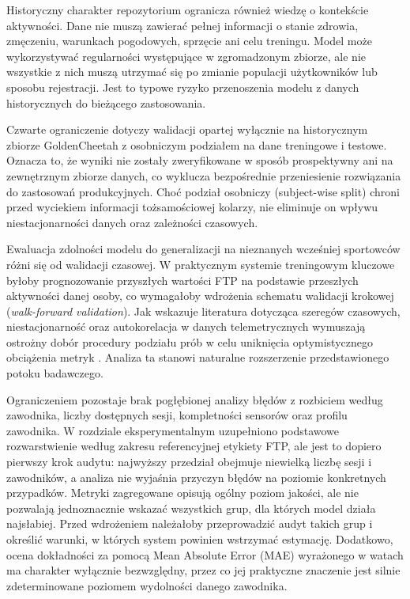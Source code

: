 Historyczny charakter repozytorium ogranicza również wiedzę o kontekście aktywności. Dane nie muszą zawierać pełnej informacji o stanie zdrowia, zmęczeniu, warunkach pogodowych, sprzęcie ani celu treningu. Model może wykorzystywać regularności występujące w zgromadzonym zbiorze, ale nie wszystkie z nich muszą utrzymać się po zmianie populacji użytkowników lub sposobu rejestracji. Jest to typowe ryzyko przenoszenia modelu z danych historycznych do bieżącego zastosowania.

Czwarte ograniczenie dotyczy walidacji opartej wyłącznie na historycznym zbiorze GoldenCheetah z osobniczym podziałem na dane treningowe i testowe. Oznacza to, że wyniki nie zostały zweryfikowane w sposób prospektywny ani na zewnętrznym zbiorze danych, co wyklucza bezpośrednie przeniesienie rozwiązania do zastosowań produkcyjnych. Choć podział osobniczy (subject-wise split) chroni przed wyciekiem informacji tożsamościowej kolarzy, nie eliminuje on wpływu niestacjonarności danych oraz zależności czasowych.

Ewaluacja zdolności modelu do generalizacji na nieznanych wcześniej sportowców różni się od walidacji czasowej. W praktycznym systemie treningowym kluczowe byłoby prognozowanie przyszłych wartości FTP na podstawie przeszłych aktywności danej osoby, co wymagałoby wdrożenia schematu walidacji krokowej (\textit{walk-forward validation}). Jak wskazuje literatura dotycząca szeregów czasowych, niestacjonarność oraz autokorelacja w danych telemetrycznych wymuszają ostrożny dobór procedury podziału prób w celu uniknięcia optymistycznego obciążenia metryk \parencite{bergmeir2018timeSeriesCv}. Analiza ta stanowi naturalne rozszerzenie przedstawionego potoku badawczego.

Ograniczeniem pozostaje brak pogłębionej analizy błędów z rozbiciem według zawodnika, liczby dostępnych sesji, kompletności sensorów oraz profilu zawodnika. W rozdziale eksperymentalnym uzupełniono podstawowe rozwarstwienie według zakresu referencyjnej etykiety FTP, ale jest to dopiero pierwszy krok audytu: najwyższy przedział obejmuje niewielką liczbę sesji i zawodników, a analiza nie wyjaśnia przyczyn błędów na poziomie konkretnych przypadków. Metryki zagregowane opisują ogólny poziom jakości, ale nie pozwalają jednoznacznie wskazać wszystkich grup, dla których model działa najsłabiej. Przed wdrożeniem należałoby przeprowadzić audyt takich grup i określić warunki, w których system powinien wstrzymać estymację. Dodatkowo, ocena dokładności za pomocą Mean Absolute Error (MAE) wyrażonego w watach ma charakter wyłącznie bezwzględny, przez co jej praktyczne znaczenie jest silnie zdeterminowane poziomem wydolności danego zawodnika.

